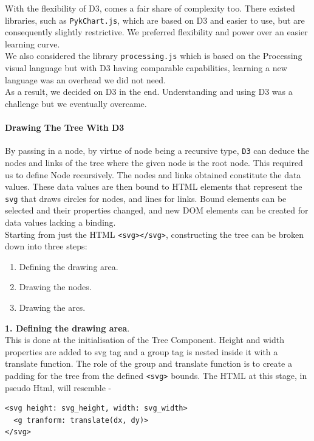 \documentclass[titlepage,11pt]{article}
\begin{document}
With the flexibility of D3, comes a fair share of complexity too. There existed libraries, such as \texttt{PykChart.js}, which are based on D3 and easier to use, but are consequently slightly restrictive. We preferred flexibility and power over an easier learning curve. \\

We also considered the library \texttt{processing.js} which is based on the Processing visual language but with D3 having comparable capabilities, learning a new language was an overhead we did not need. \\

As a result, we decided on D3 in the end. Understanding and using D3 was a challenge but we eventually overcame.

\paragraph{Drawing The Tree With D3}
By passing in a node, by virtue of node being a recursive type, \texttt{D3} can deduce the nodes and links of the tree where the given node is the root node. This required us to define Node recursively.  The nodes and links obtained constitute the data values. These data values are then bound to HTML elements that represent the \texttt{svg} that draws circles for nodes, and lines for links.  Bound elements can be selected and their properties changed, and new DOM elements can be created for data values lacking a binding. \\

Starting from just the HTML \texttt{<svg></svg>}, constructing the tree can be broken down into three steps:
\begin{enumerate}
\item Defining the drawing area.
\item Drawing the nodes.
\item Drawing the arcs.
\end{enumerate}

\textbf{1. Defining the drawing area}. \\

This is done at the initialisation of the Tree Component. Height and width properties are added to svg tag and a group tag is nested inside it with a translate function. The role of the group and translate function is to create a padding for the tree from the defined \texttt{<svg>} bounds. The HTML at this stage, in pseudo Html, will resemble -
\begin{lstlisting}
<svg height: svg_height, width: svg_width>
  <g tranform: translate(dx, dy)>
</svg>
\end{lstlisting} 
\end{document}
